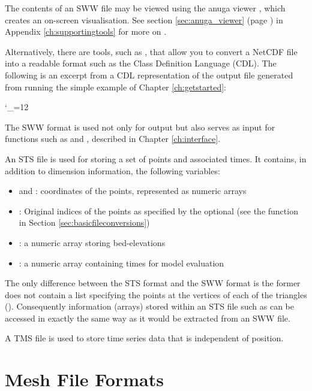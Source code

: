 \documentclass{manual}
\newcommand{\verbatiminputB}[1]{%
\endgroup}
\def\verbatiminputunderscore{\begingroup
\catcode`\_=12
\verbatiminputB}
\begin{document}
The contents of an SWW file may be viewed using the anuga viewer ,
which creates an on-screen visualisation.  See section \ref{sec:anuga_viewer}
(page \pageref{sec:anuga_viewer}) in Appendix \ref{ch:supportingtools} for more on .

Alternatively, there are tools, such as , that allow
you to convert a NetCDF file into a readable format such as the
Class Definition Language (CDL). The following is an excerpt from a
CDL representation of the output file  generated
from running the simple example  of Chapter \ref{ch:getstarted}:

\verbatiminputunderscore{../../anuga_core/examples/bedslopeexcerpt.cdl}

The SWW format is used not only for output but also serves as input
for functions such as  and
, described in Chapter \ref{ch:interface}.

An STS file is used for storing a set of points and associated times.
It contains, in addition to dimension information, the following
variables:
\begin{itemize}
  \item {} and : coordinates of the points, represented as numeric arrays
  \item {}: Original indices of the points as specified by the optional 
                            (see the function  in Section \ref{sec:basicfileconversions})
  \item {}: a numeric array storing bed-elevations
  \item {}: a numeric array containing times for model evaluation
\end{itemize}

The only difference between the STS format and the SWW format is the former does
not contain a list specifying the points at the vertices of each of the triangles
(). Consequently information (arrays) stored within an STS file such
as  can be accessed in exactly the same way as it would be extracted
from an SWW file.

A TMS file is used to store time series data that is independent of position.

\section{Mesh File Formats}
\end{document}

